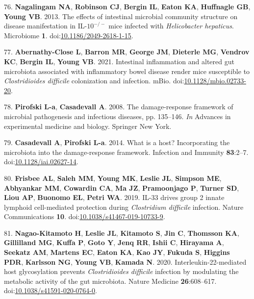 \documentclass[
  12pt,
]{article}
\newenvironment{cslreferences}%
  {}%
  {\par}
\begin{document}
\begin{cslreferences}
\leavevmode\hypertarget{ref-Nagalingam2013}{}%
76. \textbf{Nagalingam NA}, \textbf{Robinson CJ}, \textbf{Bergin IL},
\textbf{Eaton KA}, \textbf{Huffnagle GB}, \textbf{Young VB}. 2013. The
effects of intestinal microbial community structure on disease
manifestation in IL-\(10^{-/-}\) mice infected with \emph{Helicobacter
hepaticus}. Microbiome \textbf{1}.
doi:\href{https://doi.org/10.1186/2049-2618-1-15}{10.1186/2049-2618-1-15}.

\leavevmode\hypertarget{ref-AbernathyClose2021}{}%
77. \textbf{Abernathy-Close L}, \textbf{Barron MR}, \textbf{George JM},
\textbf{Dieterle MG}, \textbf{Vendrov KC}, \textbf{Bergin IL},
\textbf{Young VB}. 2021. Intestinal inflammation and altered gut
microbiota associated with inflammatory bowel disease render mice
susceptible to \emph{Clostridioides difficile} colonization and
infection. mBio.
doi:\href{https://doi.org/10.1128/mbio.02733-20}{10.1128/mbio.02733-20}.

\leavevmode\hypertarget{ref-Pirofski2008}{}%
78. \textbf{Pirofski L-a}, \textbf{Casadevall A}. 2008. The
damage-response framework of microbial pathogenesis and infectious
diseases, pp. 135--146. \emph{In} Advances in experimental medicine and
biology. Springer New York.

\leavevmode\hypertarget{ref-Casadevall2014}{}%
79. \textbf{Casadevall A}, \textbf{Pirofski L-a}. 2014. What is a host?
Incorporating the microbiota into the damage-response framework.
Infection and Immunity \textbf{83}:2--7.
doi:\href{https://doi.org/10.1128/iai.02627-14}{10.1128/iai.02627-14}.

\leavevmode\hypertarget{ref-Frisbee2019}{}%
80. \textbf{Frisbee AL}, \textbf{Saleh MM}, \textbf{Young MK},
\textbf{Leslie JL}, \textbf{Simpson ME}, \textbf{Abhyankar MM},
\textbf{Cowardin CA}, \textbf{Ma JZ}, \textbf{Pramoonjago P},
\textbf{Turner SD}, \textbf{Liou AP}, \textbf{Buonomo EL}, \textbf{Petri
WA}. 2019. IL-33 drives group 2 innate lymphoid cell-mediated protection
during \emph{Clostridium difficile} infection. Nature Communications
\textbf{10}.
doi:\href{https://doi.org/10.1038/s41467-019-10733-9}{10.1038/s41467-019-10733-9}.

\leavevmode\hypertarget{ref-NagaoKitamoto2020}{}%
81. \textbf{Nagao-Kitamoto H}, \textbf{Leslie JL}, \textbf{Kitamoto S},
\textbf{Jin C}, \textbf{Thomsson KA}, \textbf{Gillilland MG},
\textbf{Kuffa P}, \textbf{Goto Y}, \textbf{Jenq RR}, \textbf{Ishii C},
\textbf{Hirayama A}, \textbf{Seekatz AM}, \textbf{Martens EC},
\textbf{Eaton KA}, \textbf{Kao JY}, \textbf{Fukuda S}, \textbf{Higgins
PDR}, \textbf{Karlsson NG}, \textbf{Young VB}, \textbf{Kamada N}. 2020.
Interleukin-22-mediated host glycosylation prevents \emph{Clostridioides
difficile} infection by modulating the metabolic activity of the gut
microbiota. Nature Medicine \textbf{26}:608--617.
doi:\href{https://doi.org/10.1038/s41591-020-0764-0}{10.1038/s41591-020-0764-0}.


\end{cslreferences}
\end{document}
